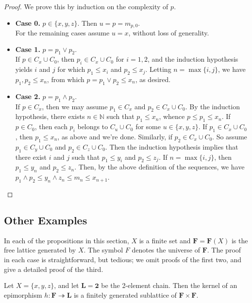 \begin{proof} We prove this by induction on the complexity of $p$. 

\begin{itemize}
  \item {\bf Case 0.} $p\in \{x, y, z\}$. Then $u = p = m_{p,0}$.\\
  For the remaining cases assume $u = x$, without loss of generality.

  \item {\bf Case 1.} $p = p_1 \vee p_2$.  \\
  If $p \in C_x\cup C_0$, then $p_i \in C_x \cup C_0$ for $i = 1, 2$, and 
  the induction hypothesis yields $i$ and $j$ for which $p_1 \leqslant x_i$ 
  and $p_2 \leqslant x_j$. Letting $n = \max\{i, j\}$, we have 
  $p_1, p_2 \leqslant x_n$, from which $p = p_1 \vee p_2 \leqslant x_n$, as desired.

  \item {\bf Case 2.} $p = p_1 \wedge p_2$.  \\
  If $p \in C_x$, then we may assume $p_1 \in C_x$ and $p_2 \in C_x \cup C_0$. 
  By the induction hypothesis, there exists $n\in \mathbb N$ such that 
  $p_1 \leqslant x_n$, whence $p \leqslant p_1 \leqslant x_n$.
  If $p \in C_0$, then each $p_i$ belongs to $C_u \cup C_0$ for some 
  $u\in \{x, y, z\}$.  If $p_1 \in C_x \cup C_0$, then $p_1 \leqslant x_n$, as 
  above and we're done.  Similarly, if $p_2 \in C_x \cup C_0$.  So assume 
  $p_1 \in C_y \cup C_0$ and $p_2 \in C_z \cup C_0$. Then the induction 
  hypothesis implies that there exist $i$ and $j$ such that 
  $p_1 \leqslant y_i$ and $p_2 \leqslant z_j$. If $n = \max\{i, j\}$, then
  $p_1 \leqslant y_n$ and $p_2 \leqslant z_n$.  Then, by the above definition 
  of the sequences, we have $p_1 \wedge p_2 \leqslant y_n \wedge z_n \leqslant 
  m_n \leqslant x_{n+1}$.
\end{itemize}
\end{proof}

\subsection{Other Examples}
In each of the propositions in this section, $X$ is a finite set and 
$\mathbf{F} = \mathbf{F}(X)$ is the free lattice generated by $X$.
The symbol $F$ denotes the universe of $\mathbf{F}$.  
The proof in each case is straightforward, but tedious;
we omit proofs of the first two, and give a detailed proof of the third.
\begin{prop}\label{prop:1}
Let $X = \{x,y,z\}$, and let $\mathbf{L} = \mathbf{2}$ be the 2-element chain.    
Then the kernel of an epimorphism $h\colon \mathbf{F} \twoheadrightarrow \mathbf{L}$ 
is a finitely generated sublattice of $\mathbf{F} \times \mathbf{F}$.
\end{prop}

